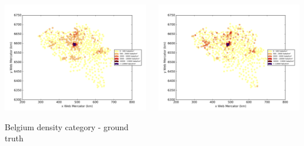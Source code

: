 \documentclass[c]{beamer}
\begin{document}
\begin{frame}
\begin{columns}
 \begin{column}{0.5\textwidth}
  \begin{overlayarea}{\linewidth}{4cm}
    \centering\vfill
    \includegraphics[scale=0.25]{../../data/Belgique/test/Neural_Network_Classification-oversampling/Neural_Network_Classification-oversampling/density_ground_truth.png}
  \end{overlayarea}
  \begin{overlayarea}{\linewidth}{0.5cm}
    \centering
    \tiny Belgium density category - ground truth\par
  \end{overlayarea}
 \end{column}
 \begin{column}{0.5\textwidth}
  \begin{overlayarea}{\linewidth}{4cm}
    \centering\vfill
    \includegraphics[scale=0.25]{../../data/Belgique/test/Neural_Network_Classification-oversampling/Neural_Network_Classification-oversampling/density_classification.png}

\end{overlayarea}
\end{column}
\end{columns}
\end{frame}
\end{document}
